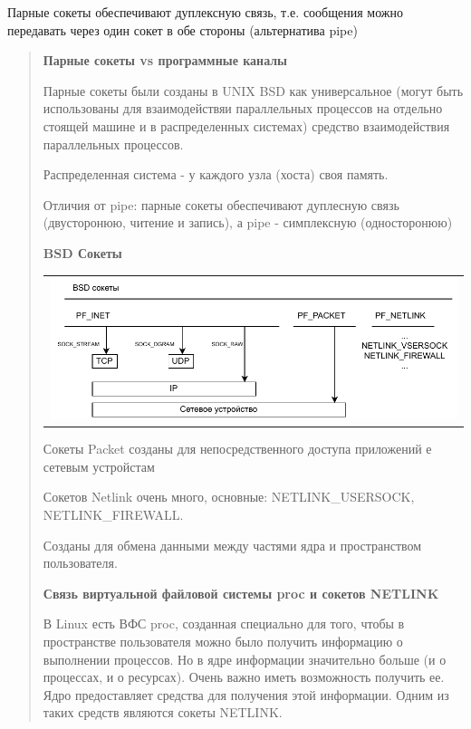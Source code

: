 Парные сокеты обеспечивают дуплексную связь, т.е. сообщения можно передавать через один сокет в обе стороны (альтернатива pipe)

\begin{quote}
	\textbf{Парные сокеты vs программные каналы}

  Парные сокеты были созданы в UNIX BSD как универсальное (могут быть использованы для взаимодействяи параллельных процессов на отдельно стоящей машине и в распределенных системах) средство взаимодействия параллельных процессов.

  Распределенная система - у каждого узла (хоста) своя память.

  Отличия от pipe: парные сокеты обеспечивают дуплесную связь (двусторонюю, читение и запись), а pipe - симплексную (односторонюю)

  \textbf{BSD Сокеты}

  \begin{table}[H]
  \centering
  \begin{tabular}{p{1\linewidth}}
    \centering
    \includegraphics[width=0.8\linewidth]{./images/8-2.pdf}
  \end{tabular}
\end{table}

  Сокеты Packet созданы для непосредственного доступа приложений е сетевым устройстам

  Сокетов Netlink очень много, основные: NETLINK\_USERSOCK, NETLINK\_FIREWALL.

  Созданы для обмена данными между частями ядра и пространством пользователя.

  \textbf{Связь виртуальной файловой системы proc и сокетов NETLINK}

  В Linux есть ВФС proc, созданная специально для того, чтобы в пространстве пользователя можно было получить информацию о выполнении процессов. Но в ядре информации значительно больше (и о процессах, и о ресурсах). Очень важно иметь возможность получить ее. Ядро предоставляет средства для получения этой информации. Одним из таких средств являются сокеты NETLINK.
\end{quote}

